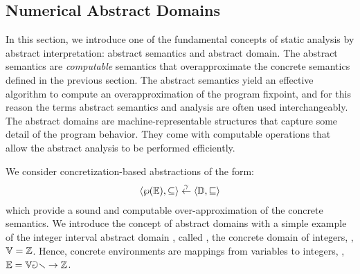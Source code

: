 \subsection{Numerical Abstract Domains}

In this section, we introduce one of the fundamental concepts of static analysis by abstract interpretation: abstract semantics and abstract domain. The abstract semantics are \emph{computable} semantics that overapproximate the concrete semantics defined in the previous section. The abstract semantics yield an effective algorithm to compute an overapproximation of the program fixpoint, and for this reason the terms abstract semantics and analysis are often used interchangeably. The abstract domains are machine-representable structures that capture some detail of the program behavior. They come with computable operations that allow the abstract analysis to be performed efficiently.

We consider concretization-based abstractions of the form:
\begin{align*}
  \langle \wp(\mathbb{E}), \subseteq \rangle \overset{\gamma}{\leftarrow} \langle \mathbb{D}, \sqsubseteq \rangle
\end{align*}
which provide a sound and computable over-approximation of the concrete semantics.
  We introduce the concept of abstract domains with a simple example of the integer interval abstract domain , called \intervalname, \wrt{} the concrete domain of integers, \ie, $\mathbb{V} = \mathbb{Z}$.
  Hence, concrete environments are mappings from variables to integers, \ie, $\mathbb{E} = \mathbb{Var} \to \mathbb{Z}$.

